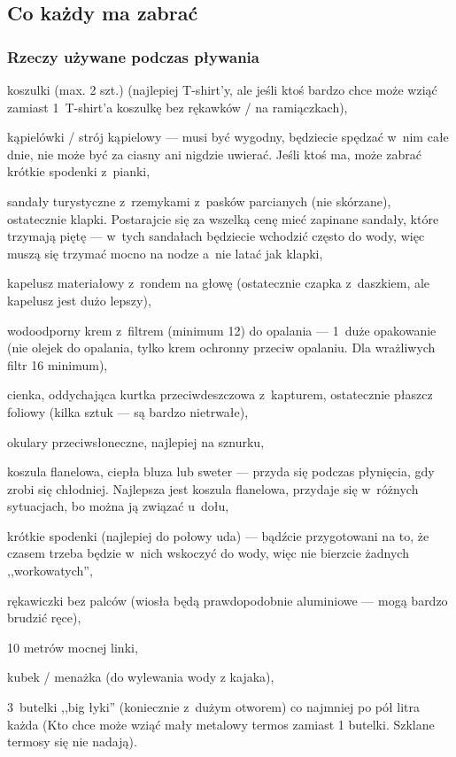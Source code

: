 \subsection{Co każdy ma zabrać}
\subsubsection{Rzeczy używane podczas pływania\label{podczas_plywania}}
\begin{checklist}
\item koszulki (max. 2 szt.) (najlepiej T-shirt’y, ale jeśli ktoś bardzo chce może wziąć zamiast 1~T-shirt’a koszulkę bez rękawków / na ramiączkach),
\item kąpielówki / strój kąpielowy --- musi być wygodny, będziecie spędzać w~nim całe dnie, nie może być za ciasny ani nigdzie uwierać. Jeśli ktoś ma, może zabrać krótkie spodenki z~pianki,
\item sandały turystyczne z~rzemykami z~pasków parcianych (nie skórzane), ostatecznie klapki. Postarajcie się za wszelką cenę mieć zapinane sandały, które trzymają piętę --- w~tych sandałach będziecie wchodzić często do wody, więc muszą się trzymać mocno na nodze a~nie latać jak klapki,
\item kapelusz materiałowy z~rondem na głowę (ostatecznie czapka z~daszkiem, ale kapelusz jest dużo lepszy),
\item wodoodporny krem z~filtrem (minimum 12) do opalania --- 1~duże opakowanie (nie olejek do opalania, tylko krem ochronny przeciw opalaniu. Dla wrażliwych filtr 16 minimum),
\item cienka, oddychająca kurtka przeciwdeszczowa z~kapturem, ostatecznie płaszcz foliowy (kilka sztuk --- są bardzo nietrwałe),
\item okulary przeciwsłoneczne, najlepiej na sznurku,
\item koszula flanelowa, ciepła bluza lub sweter --- przyda się podczas płynięcia, gdy zrobi się chłodniej. Najlepsza jest koszula flanelowa, przydaje się w~różnych sytuacjach, bo można ją związać u~dołu,
\item krótkie spodenki (najlepiej do połowy uda) --- bądźcie przygotowani na to, że czasem trzeba będzie w~nich wskoczyć do wody, więc nie bierzcie żadnych ,,workowatych'',
\item rękawiczki bez palców (wiosła będą prawdopodobnie aluminiowe --- mogą bardzo brudzić ręce),
\item 10 metrów mocnej linki,
\item kubek / menażka (do wylewania wody z kajaka),
\item 3~butelki ,,big łyki'' (koniecznie z~dużym otworem) co najmniej po pół litra każda (Kto chce może wziąć mały metalowy termos zamiast 1 butelki. Szklane termosy się nie nadają).
\end{checklist}

